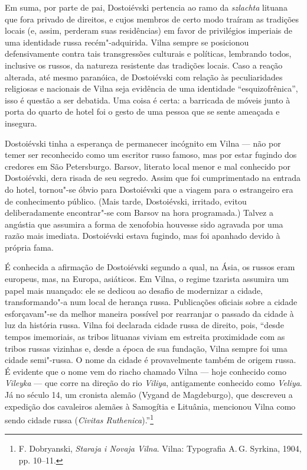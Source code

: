 Em suma, por parte de pai, Dostoiévski pertencia ao ramo da
\emph{szlachta} lituana que fora privado de direitos, e cujos membros de
certo modo traíram as tradições locais (e, assim, perderam suas
residências) em favor de privilégios imperiais de uma identidade russa
recém"-adquirida. Vilna sempre se posicionou defensivamente contra tais
transgressões culturais e políticas, lembrando todos, inclusive os
russos, da natureza resistente das tradições locais. Caso a reação
alterada, até mesmo paranóica, de Dostoiévski com relação às
peculiaridades religiosas e nacionais de Vilna seja evidência de uma
identidade ``esquizofrênica'', isso é questão a ser debatida. Uma coisa
é certa: a barricada de móveis junto à porta do quarto de hotel foi o
gesto de uma pessoa que se sente ameaçada e insegura.

Dostoiévski tinha a esperança de permanecer incógnito em Vilna --- não por
temer ser reconhecido como um escritor russo famoso, mas por estar
fugindo dos credores em São Petersburgo. Barsov, literato local menor e
mal conhecido por Dostoiévski, dera risada de seu segredo. Assim que foi
cumprimentado na entrada do hotel, tornou"-se óbvio para Dostoiévski que
a viagem para o estrangeiro era de conhecimento público. (Mais tarde,
Dostoiévski, irritado, evitou deliberadamente encontrar"-se com Barsov na
hora programada.) Talvez a angústia que assumira a forma de xenofobia
houvesse sido agravada por uma razão mais imediata. Dostoiévski estava
fugindo, mas foi apanhado devido à própria fama.

\asterisc

É conhecida a afirmação de Dostoiévski segundo a qual, na Ásia, os
russos eram europeus, mas, na Europa, asiáticos. Em Vilna, o regime
tzarista assumira um papel mais nuançado: ele se dedicou ao desafio de
modernizar a cidade, transformando"-a num local de herança russa.
Publicações oficiais sobre a cidade esforçavam"-se da melhor maneira
possível por rearranjar o passado da cidade à luz da história russa.
Vilna foi declarada cidade russa de direito, pois, ``desde tempos
imemoriais, as tribos lituanas viviam em estreita proximidade com as
tribos russas vizinhas e, desde a época de sua fundação, Vilna sempre
foi uma cidade semi"-russa. O nome da cidade é provavelmente também de
origem russa. É evidente que o nome vem do riacho chamado Vilna --- hoje
conhecido como \emph{Vileyka} --- que corre na direção do rio
\emph{Viliya}, antigamente conhecido como \emph{Veliya}. Já no século
14, um cronista alemão (Vygand de Magdeburgo), que descreveu a expedição
dos cavaleiros alemães à Samogítia e Lituânia, mencionou Vilna como
sendo cidade russa (\emph{Civitas Ruthenica}).''\footnote{F. Dobryanski,
  \emph{Staraja i Novaja Vilna}. Vilna: Typografia A.\,G. Syrkina, 1904,
  pp. 10--11.}

